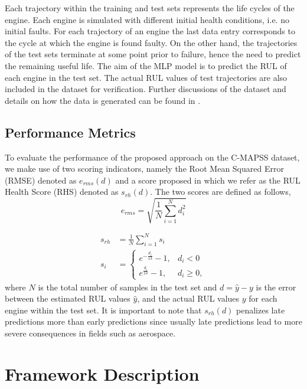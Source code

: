 \documentclass[preprint,12pt]{elsarticle}%
\begin{document}
Each trajectory within the training and test sets represents the life cycles
of the engine. Each engine is simulated with different initial health
conditions, i.e. no initial faults. For each trajectory of an engine the last
data entry corresponds to the cycle at which the engine is found faulty. On
the other hand, the trajectories of the test sets terminate at some point
prior to failure, hence the need to predict the remaining useful life. The aim
of the MLP model is to predict the RUL of each engine in the test set. The
actual RUL values of test trajectories are also included in the dataset for
verification. Further discussions of the dataset and details on how the data
is generated can be found in \cite{Saxena2008}.

\subsection{Performance Metrics}

\label{sec:rul_metrics}

To evaluate the performance of the proposed approach on the C-MAPSS dataset, we
make use of two scoring indicators, namely the Root Mean Squared Error (RMSE)
denoted as $e_{rms}(d)$ and a score proposed in \cite{Saxena2008} which we
refer as the RUL Health Score (RHS) denoted as $s_{rh}(d)$. The two scores are
defined as follows,
\begin{equation}
e_{rms} = \sqrt{ \frac{1}{N} \sum_{i=1}^{N}{d_{i}^{2}}} \label{eq:rmse}%
\end{equation}
%

\begin{align}
s_{rh}  &  = \frac{1}{N} \sum_{i=1}^{N}{s_{i}}\nonumber\\
s_{i}  &  =
\begin{cases}
e^{-\frac{d_{i}}{13}} - 1, & d_{i} < 0\\
e^{\frac{d_{i}}{10}} - 1, & d_{i} \geq0,
\end{cases}
\label{eq:rhs}%
\end{align}
where $N$ is the total number of samples in the test set and $d = \hat{y} - y$
is the error between the estimated RUL values $\hat{y}$, and the actual RUL
values $y$ for each engine within the test set. It is important to note that
$s_{rh}(d)$ penalizes late predictions more than early predictions since
usually late predictions lead to more severe consequences in fields such as aerospace.

\section{Framework Description}
\end{document}
